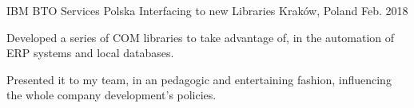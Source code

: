 \begin{cventries}
  \cventry
    {IBM BTO Services Polska} %
    {Interfacing to new Libraries} %
    {Kraków, Poland} %
    {Feb. 2018} %
    {
        \begin{cvitems} %
            \item {Developed a series of COM libraries to take advantage of, in the automation of ERP systems and local databases.}
            \item {Presented it to my team, in an pedagogic and entertaining fashion, influencing the whole company development's policies.}
        \end{cvitems}
    }

\end{cventries}
